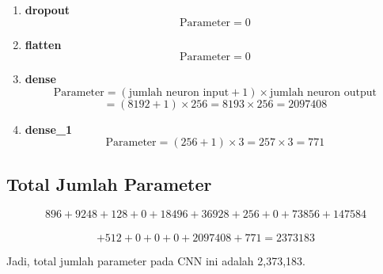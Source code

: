 \begin{enumerate}
    \item \textbf{dropout}
    \[
    \text{Parameter} = 0
    \]

    \item \textbf{flatten}
    \[
    \text{Parameter} = 0
    \]

    \item \textbf{dense}
    \[
    \text{Parameter} = (\text{jumlah neuron input} + 1) \times \text{jumlah neuron output}
    \]
    \[
    = (8192 + 1) \times 256 = 8193 \times 256 = 2097408
    \]

    \item \textbf{dense\_1}
    \[
    \text{Parameter} = (256 + 1) \times 3 = 257 \times 3 = 771
    \]
\end{enumerate}

\subsection*{Total Jumlah Parameter}

\[
896 + 9248 + 128 + 0 + 18496 + 36928 + 256 + 0 + 73856 + 147584 \]\\
\[ + 512 + 0 + 0 + 0 + 2097408 + 771 = 2373183
\]

Jadi, total jumlah parameter pada CNN ini adalah 2,373,183.
